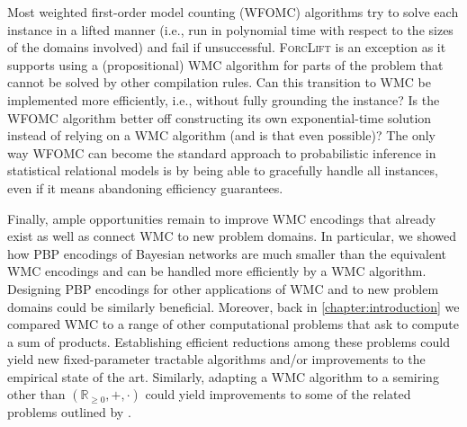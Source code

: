 Most weighted first-order model counting (WFOMC) algorithms try to solve each
instance in a lifted manner (i.e., run in polynomial time with respect to the
sizes of the domains involved) and fail if unsuccessful. \textsc{ForcLift} is an
exception as it supports using a (propositional) WMC algorithm for parts of the
problem that cannot be solved by other compilation rules. Can this transition to
WMC be implemented more efficiently, i.e., without fully grounding the instance?
Is the WFOMC algorithm better off constructing its own exponential-time solution
instead of relying on a WMC algorithm (and is that even possible)? The only way
WFOMC can become the standard approach to probabilistic inference in statistical
relational models is by being able to gracefully handle all instances, even if
it means abandoning efficiency guarantees.

Finally, ample opportunities remain to improve WMC encodings that already exist
as well as connect WMC to new problem domains. In particular, we showed how PBP
encodings of Bayesian networks are much smaller than the equivalent WMC
encodings and can be handled more efficiently by a WMC algorithm. Designing PBP
encodings for other applications of WMC and to new problem domains could be
similarly beneficial. Moreover, back in \cref{chapter:introduction} we compared
WMC to a range of other computational problems that ask to compute a sum of
products. Establishing efficient reductions among these problems could yield new
fixed-parameter tractable algorithms and/or improvements to the empirical state
of the art. Similarly, adapting a WMC algorithm to a semiring other than
$(\mathbb{R}_{\ge 0}, +, \cdot)$ could yield improvements to some of the related
problems outlined by \citet{DBLP:journals/japll/KimmigBR17}.


